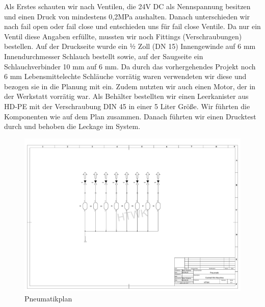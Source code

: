\documentclass[10pt,a4paper]{report}
\begin{document}
	Als Erstes schauten wir nach Ventilen, die 24V DC als Nennspannung besitzen und einen Druck
	von mindestens 0,2MPa aushalten. Danach unterschieden wir nach fail open oder fail close und
	entschieden uns für fail close Ventile. Da nur ein Ventil diese Angaben erfüllte, mussten wir noch
	Fittings (Verschraubungen) bestellen. Auf der Druckseite wurde ein ½ Zoll (DN 15) Innengewinde
	auf 6 mm Innendurchmesser Schlauch bestellt sowie, auf der Saugseite ein Schlauchverbinder 10
	mm auf 6 mm.
	Da durch das vorhergehendes Projekt noch 6 mm Lebensmittelechte Schläuche vorrätig waren
	verwendeten wir diese und bezogen sie in die Planung mit ein.
	Zudem nutzten wir auch einen Motor, der in der Werkstatt vorrätig war.
	Als Behälter bestellten wir einen Leerkanister aus HD-PE mit der Verschraubung DIN 45 in einer 5
	Liter Größe.
	Wir führten die Komponenten wie auf dem Plan zusammen.
	Danach führten wir einen Drucktest durch und behoben die
	Leckage im System.
	\newpage
	\begin{figure}[htb]
		\includegraphics[width=1\textwidth]{Pneumatik (Version2).pdf}
		\centering
		\caption{Pneumatikplan}
	\end{figure}
	
\end{document}
